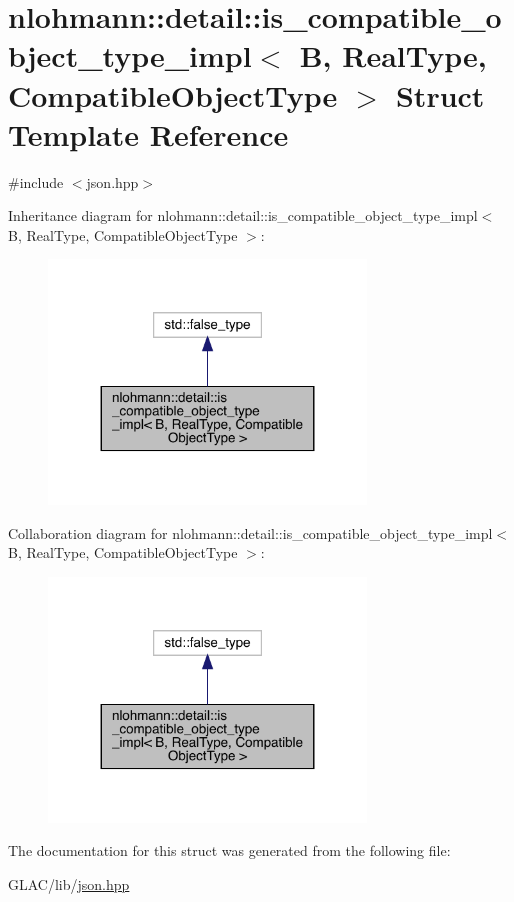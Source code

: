 \hypertarget{structnlohmann_1_1detail_1_1is__compatible__object__type__impl}{}\section{nlohmann\+::detail\+::is\+\_\+compatible\+\_\+object\+\_\+type\+\_\+impl$<$ B, Real\+Type, Compatible\+Object\+Type $>$ Struct Template Reference}
\label{structnlohmann_1_1detail_1_1is__compatible__object__type__impl}


{\ttfamily \#include $<$json.\+hpp$>$}



Inheritance diagram for nlohmann\+::detail\+::is\+\_\+compatible\+\_\+object\+\_\+type\+\_\+impl$<$ B, Real\+Type, Compatible\+Object\+Type $>$\+:\nopagebreak
\begin{figure}[H]
\begin{center}
\leavevmode
\includegraphics[width=239pt]{structnlohmann_1_1detail_1_1is__compatible__object__type__impl__inherit__graph}
\end{center}
\end{figure}


Collaboration diagram for nlohmann\+::detail\+::is\+\_\+compatible\+\_\+object\+\_\+type\+\_\+impl$<$ B, Real\+Type, Compatible\+Object\+Type $>$\+:\nopagebreak
\begin{figure}[H]
\begin{center}
\leavevmode
\includegraphics[width=239pt]{structnlohmann_1_1detail_1_1is__compatible__object__type__impl__coll__graph}
\end{center}
\end{figure}


The documentation for this struct was generated from the following file\+:\begin{DoxyCompactItemize}
\item 
G\+L\+A\+C/lib/\mbox{\hyperlink{json_8hpp}{json.\+hpp}}\end{DoxyCompactItemize}
